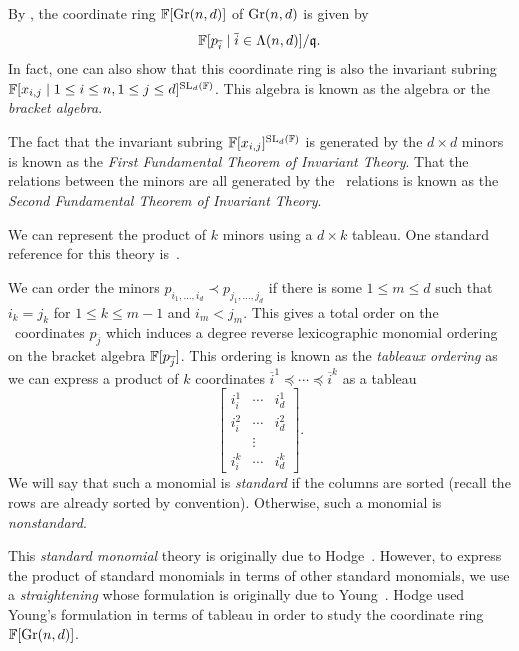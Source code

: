 \documentclass[letterpaper, 11pt]{amsart}
\newif\iffull
\begin{document}
\fi


\begin{defn}
  By , the coordinate ring $\mathbb{F}[\operatorname{Gr}(n, d)]$ of $\operatorname{Gr}(n, d)$ is given by
  \[
    \mathbb{F}[p_{\overline{i}} \mid \overline{i} \in \Lambda(n, d)] / \mathfrak{q}.
  \]
  In fact, one can also show that this coordinate ring is also the invariant subring $\mathbb{F}[x_{i, j} \mid 1 \leq i \leq n, 1 \leq j \leq d]^{\operatorname{SL}_d(\mathbb{F})}$.
  This algebra is known as the \emph{\Plucker} algebra or the \emph{bracket algebra}.
\end{defn}

The fact that the invariant subring $\mathbb{F}[x_{i, j}]^{\operatorname{SL}_d(\mathbb{F})}$ is generated by the $d \times d$ minors is known as the \emph{First Fundamental Theorem of Invariant Theory}.
That the relations between the minors are all generated by the \Plucker\ relations is known as the \emph{Second Fundamental Theorem of Invariant Theory}.

We can represent the product of $k$ minors using a $d \times k$ tableau.
One standard reference for this theory is~\cite{Stu08}.

\iffull
\clearpage
\fi

\begin{defn}
  We can order the minors $p_{i_1, \ldots, i_d} \prec p_{j_1, \ldots, j_d}$ if there is some $1 \leq m \leq d$ such that $i_k = j_k$ for $1 \leq k \leq m - 1$ and $i_m < j_m$.
  This gives a total order on the \Plucker\ coordinates $p_{\overline{j}}$ which induces a degree reverse lexicographic monomial ordering on the bracket algebra $\mathbb{F}[p_{\overline{j}}]$.
  This ordering is known as the \emph{tableaux ordering} as we can express a product of $k$ coordinates $\overline{i}^1 \preceq \cdots \preceq \overline{i}^k$ as a tableau
  \[
    \begin{bmatrix}
      i^1_i & \cdots & i^1_d \\
      i^2_i & \cdots & i^2_d \\
            & \vdots &       \\
      i^k_i & \cdots & i^k_d
    \end{bmatrix}.
  \]
  We will say that such a monomial is \emph{standard} if the columns are sorted (recall the rows are already sorted by convention).
  Otherwise, such a monomial is \emph{nonstandard}.
\end{defn}
This \emph{standard monomial} theory is originally due to Hodge~\cite{Hod43}.
However, to express the product of standard monomials in terms of other standard monomials, we use a \emph{straightening} whose formulation is originally due to Young~\cite{You28}.
Hodge used Young's formulation in terms of tableau in order to study the coordinate ring $\mathbb{F}[\operatorname{Gr}(n, d)]$.
\end{document}
